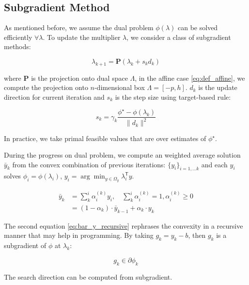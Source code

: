 \documentclass[../main]{subfiles}
\begin{document}
\subsection{Subgradient Method}\label{sec:dual.subgradient}
As mentioned before, we assume the dual problem \(\phi(\lambda)\) can be solved efficiently \(\forall \lambda\).
To update the multiplier $\lambda$, we consider a class of subgradient
methods:

\begin{equation}\label{eq:main_subgrad}
  \lambda_{k+1} = \mathbf{P}(\lambda_{k} + s_{k}d_{k})
\end{equation}

where \(\mathbf P\) is the projection onto dual space \(\Lambda\), in the affine case \eqref{eq:def_affine}, we compute the projection onto \(n\)-dimensional box \(\Lambda = [-p, h]\).
\(d_k\) is the update direction for current iteration and \(s_{k}\) is
the step size using target-based rule:

\begin{equation}\label{eq:step_size}
  s_{k} = \gamma_k\frac{\phi^\star - \phi(\lambda_k)}{\|d_{k}\|^2}
\end{equation}

In practice, we take primal feasible values that are over estimates of \(\phi^\star\).

During the progress on dual problem,
we compute an weighted average solution \(\bar y_k\) from the convex combination of previous iterations:
\(\{y_i\}_{i=1,...k}\) and each \(y_i\) solves \(\phi_i = \phi(\lambda_i)\),
\(y_i = \arg\min_{y\in \Omega_y} \lambda_i^\mathsf{T}y\).

\begin{align}
  \label{eq:bar_y_average} \bar y_k & = \sum^i_k \alpha_i^{(k)} y_i,\quad  \sum^i_k \alpha_i^{(k)} = 1,\alpha_i^{(k)} \ge 0 \\
  \label{eq:bar_y_recursive}        & = (1-\alpha_k)\cdot\bar y_{k-1} + \alpha_k \cdot y_k
\end{align}

The second equation \eqref{eq:bar_y_recursive} rephrases the convexity in a recursive manner that may help in programming.
By taking \(g_k= y_k - b\), then \(g_k\) is a subgradient
of \(\phi\) at \(\lambda_k\):

\begin{equation}g_k \in \partial \phi_k\end{equation}


The search direction can be computed from subgradient.
\end{document}
